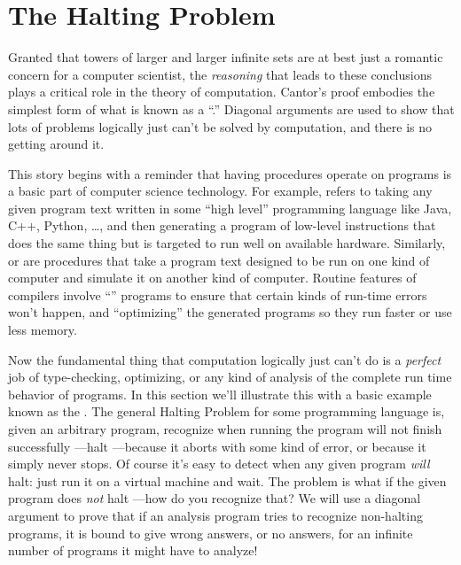 \section{The Halting Problem}\label{halting_sec}

Granted that towers of larger and larger infinite sets are at best just
a romantic concern for a computer scientist, the \emph{reasoning} that
leads to these conclusions plays a critical role in the theory of
computation.  Cantor's proof embodies the simplest form of what is
known as a ``.''  Diagonal arguments are used
to show that lots of problems logically just can't be solved
by computation, and there is no getting around it.

This story begins with a reminder that having procedures operate on
programs is a basic part of computer science technology.  For example,
\emph{} refers to taking any given program text
written in some ``high level'' programming language like Java, C++,
Python, \dots, and then generating a program of low-level instructions
that does the same thing but is targeted to run well on available
hardware.  Similarly, \emph{} or \emph{} are procedures that take a program text designed to be
run on one kind of computer and simulate it on another kind of
computer.  Routine features of compilers involve
``'' programs to ensure that certain kinds of
run-time errors won't happen, and ``optimizing'' the generated
programs so they run faster or use less memory.

Now the fundamental thing that computation logically just can't do is
a \emph{perfect} job of type-checking, optimizing, or any kind of
analysis of the complete run time behavior of programs.  In this
section we'll illustrate this with a basic example known as the
.  The general Halting Problem for some
programming language is, given an arbitrary program, recognize when
running the program will not finish successfully ---halt ---because it
aborts with some kind of error, or because it simply never stops.  Of
course it's easy to detect when any given program \emph{will} halt:
just run it on a virtual machine and wait.  The problem is what if the
given program does \emph{not} halt ---how do you recognize that?  We
will use a diagonal argument to prove that if an analysis program
tries to recognize non-halting programs, it is bound to give wrong
answers, or no answers, for an infinite number of programs it might
have to analyze!

